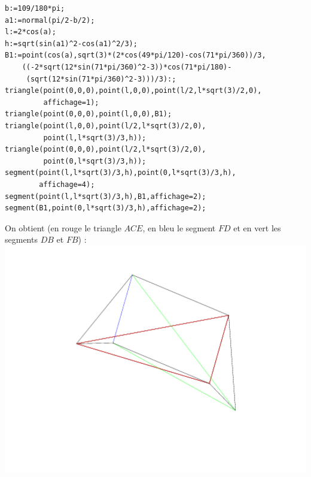 \documentclass[a4paper,11pt]{book}
\begin{document}
\begin{itemize}
\begin{verbatim}
b:=109/180*pi; 
a1:=normal(pi/2-b/2);
l:=2*cos(a);
h:=sqrt(sin(a1)^2-cos(a1)^2/3);
B1:=point(cos(a),sqrt(3)*(2*cos(49*pi/120)-cos(71*pi/360))/3,
    ((-2*sqrt(12*sin(71*pi/360)^2-3))*cos(71*pi/180)-
     (sqrt(12*sin(71*pi/360)^2-3)))/3):;
triangle(point(0,0,0),point(l,0,0),point(l/2,l*sqrt(3)/2,0),
         affichage=1);
triangle(point(0,0,0),point(l,0,0),B1);
triangle(point(l,0,0),point(l/2,l*sqrt(3)/2,0),
         point(l,l*sqrt(3)/3,h));
triangle(point(0,0,0),point(l/2,l*sqrt(3)/2,0),
         point(0,l*sqrt(3)/3,h));
segment(point(l,l*sqrt(3)/3,h),point(0,l*sqrt(3)/3,h),
        affichage=4);
segment(point(l,l*sqrt(3)/3,h),B1,affichage=2);
segment(B1,point(0,l*sqrt(3)/3,h),affichage=2);
\end{verbatim}
On obtient (en rouge le triangle $ACE$, en bleu le segment $FD$ et en vert les 
segments $DB$ et $FB$) :\\
\includegraphics[width=\textwidth]{cyclohex5}
\end{itemize}
\end{document}

